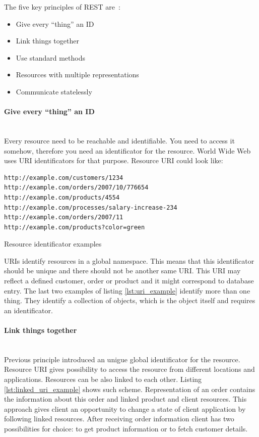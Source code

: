 The  five key principles of REST are~\cite{rest_brief_intro}:
\begin{itemize}
  
 \item Give every “thing” an ID
 \item Link things together
 \item Use standard methods
 \item Resources with multiple representations
 \item Communicate statelessly
  
\end{itemize}

\paragraph{Give every “thing” an ID}  ~\\

Every resource need to be reachable and identifiable. You need to access it
somehow, therefore you need an identificator for the resource. World Wide Web
uses URI identificators for that purpose. Resource URI could look like:

\begin{listing}[H]
\begin{verbatim}
http://example.com/customers/1234
http://example.com/orders/2007/10/776654
http://example.com/products/4554
http://example.com/processes/salary-increase-234 
http://example.com/orders/2007/11
http://example.com/products?color=green
\end{verbatim}
\caption{Resource identificator examples ~\cite{rest_brief_intro}}
\label{lst:uri_example}
\end{listing}

URIs identify resources in a global namespace. This means that this
identificator should be unique and there should not be another same URI.
This URI may reflect a defined customer, order or product and it might correspond
to database entry. The last two examples of listing \autoref{lst:uri_example} identify more
than one thing. They identify a collection of objects, which is the object
itself and requires an identificator.

\paragraph{Link things together}  ~\\

Previous principle introduced an unigue global identificator for the resource.
Resource URI gives possibility to access the resource from different locations
and applications. Resources can be also linked to each other.
Listing \ref{lst:linked_uri_example} shows such scheme. Representation of an
order contains the information about this order and linked product and client resources.
This approach gives client an opportunity to change a state of client application by following linked
resources. After receiving order information client has two possibilities for
choice: to get product information or to fetch customer details. 

